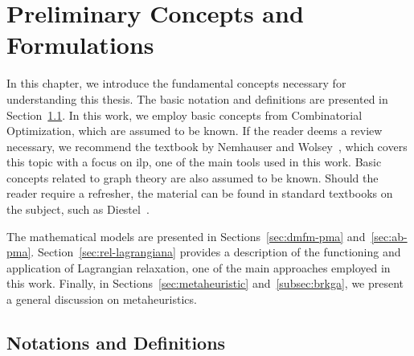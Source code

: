\chapter{Preliminary Concepts and Formulations}\label{chp:preliminary-concepts}

In this chapter, we introduce the fundamental concepts necessary for understanding this thesis. The basic notation and definitions are presented in Section~\ref{sec:not-e-def}. In this work, we employ basic concepts from Combinatorial Optimization, which are assumed to be known. If the reader deems a review necessary, we recommend the textbook by Nemhauser and Wolsey~\cite{Nemhauser}, which covers this topic with a focus on \gls{ilp}, one of the main tools used in this work. Basic concepts related to graph theory are also assumed to be known. Should the reader require a refresher, the material can be found in standard textbooks on the subject, such as Diestel~\cite{diestel:2005}. 

The mathematical models are presented in Sections~\ref{sec:dmfm-pma} and~\ref{sec:ab-pma}. Section~\ref{sec:rel-lagrangiana} provides a description of the functioning and application of Lagrangian relaxation, one of the main approaches employed in this work. Finally, in Sections~\ref{sec:metaheuristic} and~\ref{subsec:brkga}, we present a general discussion on metaheuristics.

\section{Notations and Definitions} \label{sec:not-e-def}

